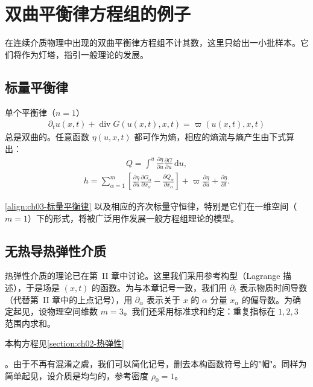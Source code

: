 ﻿\documentclass[../../main.tex]{subfiles}
\begin{document}
\section{双曲平衡律方程组的例子}\label{section:ch03-例子}

在连续介质物理中出现的双曲平衡律方程组不计其数，这里只给出一小批样本。它们将作为灯塔，指引一般理论的发展。

\subsection{标量平衡律}\label{subsection:ch03-标量平衡律}

单个平衡律（$n=1$）
\begin{align}
\partial_{t}u(x,t)+\operatorname{div}G(u(x,t),x,t)=\varpi(u(x,t),x,t)
\label{align:ch03-标量平衡律}
\end{align}
总是双曲的。任意函数 $\eta(u,x,t)$ 都可作为熵，相应的熵流与熵产生由下式算出：
\begin{align}
Q=\int^{u}\frac{\partial\eta}{\partial u}\frac{\partial G}{\partial u}\,\mathrm{d}u,
\label{align:ch03-标量熵流}
\end{align}
\begin{align}
h=\sum_{\alpha=1}^{m}\left[\frac{\partial\eta}{\partial u}\frac{\partial G_{\alpha}}{\partial x_{\alpha}}-\frac{\partial Q_{\alpha}}{\partial x_{\alpha}}\right]+\varpi\frac{\partial\eta}{\partial u}+\frac{\partial\eta}{\partial t}.
\label{align:ch03-标量熵产生}
\end{align}

\eqref{align:ch03-标量平衡律} 以及相应的齐次标量守恒律，特别是它们在一维空间（$m=1$）下的形式，将被广泛用作发展一般方程组理论的模型。

\subsection{无热导热弹性介质}\label{subsection:ch03-无热导热弹性}

热弹性介质的理论已在第~II 章中讨论。这里我们采用参考构型（Lagrange 描述），于是场是 $(x,t)$ 的函数。为与本章记号一致，我们用 $\partial_{t}$ 表示物质时间导数（代替第~II 章中的上点记号），用 $\partial_{\alpha}$ 表示关于 $x$ 的 $\alpha$ 分量 $x_{\alpha}$ 的偏导数。为确定起见，设物理空间维数 $m=3$。我们还采用标准求和约定：重复指标在 $1,2,3$ 范围内求和。

本构方程见\cref{section:ch02-热弹性}%

。由于不再有混淆之虞，我们可以简化记号，删去本构函数符号上的"帽"。同样为简单起见，设介质是均匀的，参考密度 $\rho_{0}=1$。
\end{document}
